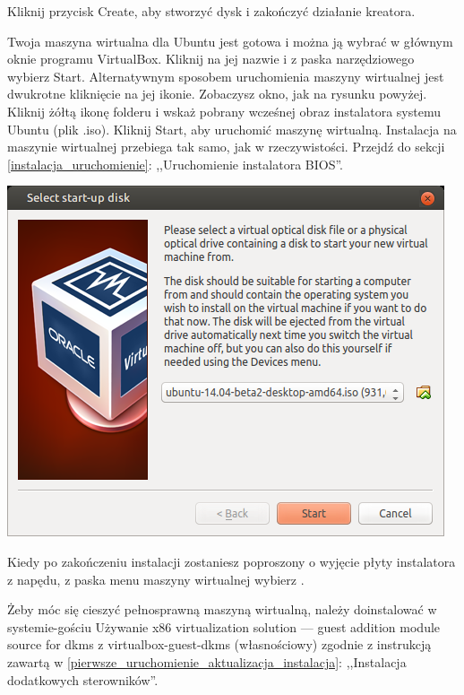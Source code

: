 Kliknij przycisk \textcolor{ubuntu_orange}{Create}, aby stworzyć dysk i zakończyć działanie kreatora.

Twoja maszyna wirtualna dla Ubuntu jest gotowa i można ją wybrać w głównym oknie programu VirtualBox. Kliknij na jej nazwie i z paska narzędziowego wybierz \textcolor{ubuntu_orange}{Start}. Alternatywnym sposobem uruchomienia maszyny wirtualnej jest dwukrotne kliknięcie na jej ikonie. Zobaczysz okno, jak na rysunku powyżej. Kliknij żółtą ikonę folderu i wskaż pobrany wcześnej obraz instalatora systemu Ubuntu (plik .iso). Kliknij \textcolor{ubuntu_orange}{Start}, aby uruchomić maszynę wirtualną. Instalacja na maszynie wirtualnej przebiega tak samo, jak w rzeczywistości. Przejdź do sekcji \ref{instalacja_uruchomienie}: ,,Uruchomienie instalatora BIOS''.

\begin{center}
	\includegraphics[width=\linewidth]{images/virtualbox_start.png}
\end{center}

Kiedy po zakończeniu instalacji zostaniesz poproszony o wyjęcie płyty instalatora z napędu, z paska menu maszyny wirtualnej wybierz .

Żeby móc się cieszyć pełnosprawną maszyną wirtualną, należy doinstalować w systemie-gościu \textcolor{ubuntu_orange}{Używanie x86 virtualization solution --- guest addition module source for dkms z virtualbox-guest-dkms (własnościowy)} zgodnie z instrukcją zawartą w \ref{pierwsze_uruchomienie_aktualizacja_instalacja}: ,,Instalacja dodatkowych sterowników''.
